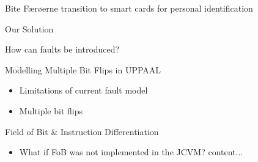 


\begin{frame}[fragile]{Bite}
Færøerne transition to smart cards for personal identification
\end{frame}

\begin{frame}[fragile]{Our Solution}
\end{frame}

\begin{frame}[fragile]{How can faults be introduced?}
\end{frame}

\begin{frame}[fragile]{Modelling Multiple Bit Flips in UPPAAL}
\begin{itemize}
\item Limitations of current fault model
\item Multiple bit flips	
\end{itemize}
\end{frame}

\begin{frame}[fragile]{Field of Bit \& Instruction Differentiation}
\begin{itemize}
\item What if FoB was not implemented in the JCVM?
content...
\end{itemize}
\end{frame}